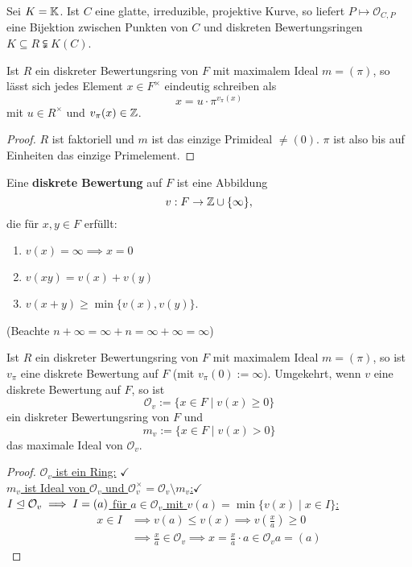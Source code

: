 \begin{theorem}
    Sei $K = \mathbb{K}$. Ist $C$ eine glatte, irreduzible, projektive Kurve, so liefert
    $ P \mapsto \mathcal{O}_{C,P}$ eine Bijektion zwischen Punkten von $C$ und diskreten
    Bewertungsringen $K \subseteq R \subsetneqq K(C)$.
\end{theorem}

\begin{satz}
    Ist $R$ ein diskreter Bewertungsring von $F$ mit maximalem Ideal $m = (\pi)$, so lässt sich jedes Element $x \in F^\times$ 
    eindeutig schreiben als
    $$ x = u \cdot \pi^{v_\pi(x)}$$
    mit $u \in R^\times$ und $v_\pi(x) \in \mathbb{Z}$.
\end{satz}
\begin{proof}
    $R$ ist faktoriell und $m$ ist das einzige Primideal $\ne (0)$. $\pi$ ist also bis auf Einheiten das einzige Primelement.
\end{proof}

\begin{definition}
    Eine \textbf{diskrete Bewertung} auf $F$ ist eine Abbildung
    $$ v: F \to \mathbb{Z} \cup \{\infty\},$$
    die für $x,y \in F$ erfüllt:
    \begin{enumerate}[label=(\arabic*)]
        \item $v(x) = \infty \implies x = 0$
        \item $v(xy) = v(x) + v(y)$
        \item $v(x+y) \geq \min\{v(x), v(y)\}$.
    \end{enumerate}
    (Beachte $n + \infty = \infty + n = \infty + \infty = \infty$)
\end{definition}

\begin{satz}
    Ist $R$ ein diskreter Bewertungsring von $F$ mit maximalem Ideal $m = (\pi)$, so ist $v_\pi$ eine 
    diskrete Bewertung auf $F$ (mit $v_\pi(0) := \infty$).
    Umgekehrt, wenn $v$ eine diskrete Bewertung auf $F$, so ist
    $$ \mathcal{O}_v := \{x \in F \mid v(x) \geq 0\}$$
    ein diskreter Bewertungsring von $F$ und
    $$ m_v := \{x \in F \mid v(x) > 0\} $$
    das maximale Ideal von $\mathcal{O}_v$.
\end{satz}
\begin{proof}
    \underline{$\mathcal{O}_v$ ist ein Ring:} $\checkmark$\\
    \underline{$m_v$ ist Ideal von $\mathcal{O}_v$ und $\mathcal{O}_v^\times = \mathcal{O}_v\setminus m_v$:}$\checkmark$\\
    \underline{$I \trianglelefteq \mathcal{O}_v \implies I=(a)$ für $a \in \mathcal{O}_v$ mit $v(a) = \min\{v(x) \mid x \in I\}$:}
    \begin{align*}
        x \in I & \implies v(a) \leq v(x) \implies v\left(\frac{x}{a}\right) \geq 0\\
        & \implies \frac{x}{a} \in \mathcal{O}_v \implies x = \frac{x}{a}\cdot a \in \mathcal{O}_v a = (a)
    \end{align*}
\end{proof}

